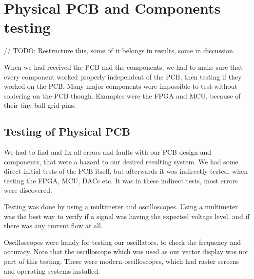 \section{Physical PCB and Components testing}

// TODO: Restructure this, some of it belongs in results, some in discussion.

When we had received the PCB and the components, we had to make sure that every component worked properly independent of the PCB, then testing if they worked on the PCB. Many major components were impossible to test without soldering on the PCB though. Examples were the FPGA and MCU, because of their tiny ball grid pins.

\subsection{Testing of Physical PCB}
We had to find and fix all errors and faults with our PCB design and components, that were a hazard to our desired resulting system.  
We had some direct initial tests of the PCB itself, but afterwards it was indirectly tested, when testing the FPGA, MCU, DACs etc. It was in these indirect tests, most errors were discovered.

Testing was done by using a multimeter and oscilloscopes. Using a multimeter was the best way to verify if a signal was having the expected voltage level, and if there was any current flow at all.

Oscilloscopes were handy for testing our oscillators, to check the frequency and accuracy. Note that the oscilloscope which was used as our vector display was not part of this testing. These were modern oscilloscopes, which had raster screens and operating systems installed.

